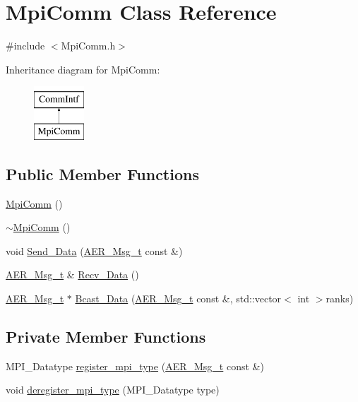 \hypertarget{classMpiComm}{}\section{Mpi\+Comm Class Reference}
\label{classMpiComm}


{\ttfamily \#include $<$Mpi\+Comm.\+h$>$}

Inheritance diagram for Mpi\+Comm\+:\begin{figure}[H]
\begin{center}
\leavevmode
\includegraphics[height=2.000000cm]{classMpiComm}
\end{center}
\end{figure}
\subsection*{Public Member Functions}
\begin{DoxyCompactItemize}
\item 
\mbox{\hyperlink{classMpiComm_a5f3b643e2c276746cc21094ab4ba6db8}{Mpi\+Comm}} ()
\item 
\mbox{\hyperlink{classMpiComm_afd95c093aeb063ee31de39a1a9104b5c}{$\sim$\+Mpi\+Comm}} ()
\item 
void \mbox{\hyperlink{classMpiComm_aa7615632d7ad06a163ea9d4fc641a85a}{Send\+\_\+\+Data}} (\mbox{\hyperlink{structAER__Msg__t}{A\+E\+R\+\_\+\+Msg\+\_\+t}} const \&)
\item 
\mbox{\hyperlink{structAER__Msg__t}{A\+E\+R\+\_\+\+Msg\+\_\+t}} \& \mbox{\hyperlink{classMpiComm_a9ff0e7421ac75131c2ce4f0bba8c2839}{Recv\+\_\+\+Data}} ()
\item 
\mbox{\hyperlink{structAER__Msg__t}{A\+E\+R\+\_\+\+Msg\+\_\+t}} $\ast$ \mbox{\hyperlink{classMpiComm_a696c567ded2b842b368b82dee950de5b}{Bcast\+\_\+\+Data}} (\mbox{\hyperlink{structAER__Msg__t}{A\+E\+R\+\_\+\+Msg\+\_\+t}} const \&, std\+::vector$<$ int $>$ranks)
\end{DoxyCompactItemize}
\subsection*{Private Member Functions}
\begin{DoxyCompactItemize}
\item 
M\+P\+I\+\_\+\+Datatype \mbox{\hyperlink{classMpiComm_aa74193c044a832b15768b4173141695d}{register\+\_\+mpi\+\_\+type}} (\mbox{\hyperlink{structAER__Msg__t}{A\+E\+R\+\_\+\+Msg\+\_\+t}} const \&)
\item 
void \mbox{\hyperlink{classMpiComm_a1ed8ee3ad0b45b8120d1665f03d22566}{deregister\+\_\+mpi\+\_\+type}} (M\+P\+I\+\_\+\+Datatype type)
\end{DoxyCompactItemize}

